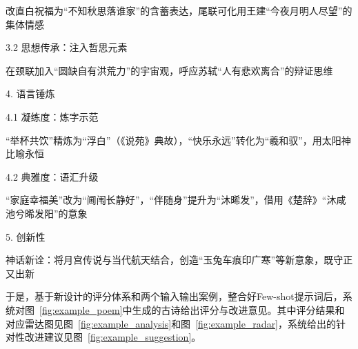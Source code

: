 \begin{tcolorbox}[
  breakable,            %
  colback=white, %
  colframe=black, 
  boxrule=1pt,        %
  arc=0mm             %
  ]
  \hspace{2em}改直白祝福为“不知秋思落谁家”的含蓄表达，尾联可化用王建“今夜月明人尽望”的集体情感\par
  \hspace{2em}3.2 思想传承：注入哲思元素\par
  \hspace{2em}在颈联加入“圆缺自有洪荒力”的宇宙观，呼应苏轼“人有悲欢离合”的辩证思维\par
  4. 语言锤炼\par
  \hspace{2em}4.1 凝练度：炼字示范\par
  \hspace{2em}“举杯共饮”精炼为“浮白”（《说苑》典故），“快乐永远”转化为“羲和驭”，用太阳神比喻永恒\par
  \hspace{2em}4.2 典雅度：语汇升级\par
  \hspace{2em}“家庭幸福美”改为“阃闱长静好”，“伴随身”提升为“沐晞发”，借用《楚辞》“沐咸池兮晞发阳”的意象\par
  5. 创新性\par
  \hspace{2em}神话新诠：将月宫传说与当代航天结合，创造“玉兔车痕印广寒”等新意象，既守正又出新\par

\end{tcolorbox}




于是，基于新设计的评分体系和两个输入输出案例，整合好Few-shot提示词后，系统对图~\ref{fig:example_poem}中生成的古诗给出评分与改进意见。其中评分结果和对应雷达图见图~\ref{fig:example_analysis}和图~\ref{fig:example_radar}，系统给出的针对性改进建议见图~\ref{fig:example_suggestion}。

